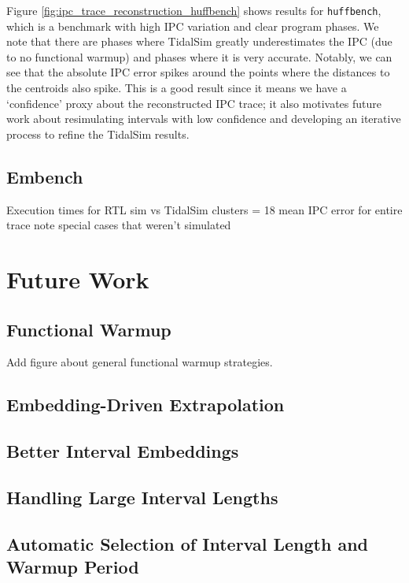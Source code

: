 \documentclass[sigplan,nonacm,10pt]{acmart}
\begin{document}
Figure \ref{fig:ipc_trace_reconstruction_huffbench} shows results for \texttt{huffbench}, which is a benchmark with high IPC variation and clear program phases.
We note that there are phases where TidalSim greatly underestimates the IPC (due to no functional warmup) and phases where it is very accurate.
Notably, we can see that the absolute IPC error spikes around the points where the distances to the centroids also spike.
This is a good result since it means we have a `confidence' proxy about the reconstructed IPC trace; it also motivates future work about resimulating intervals with low confidence and developing an iterative process to refine the TidalSim results.

\subsection{Embench}

Execution times for RTL sim vs TidalSim
clusters = 18
mean IPC error for entire trace
note special cases that weren't simulated

\section{Future Work}

\subsection{Functional Warmup}

Add figure about general functional warmup strategies.

\subsection{Embedding-Driven Extrapolation}

\subsection{Better Interval Embeddings}

\subsection{Handling Large Interval Lengths}

\subsection{Automatic Selection of Interval Length and Warmup Period}
\end{document}
